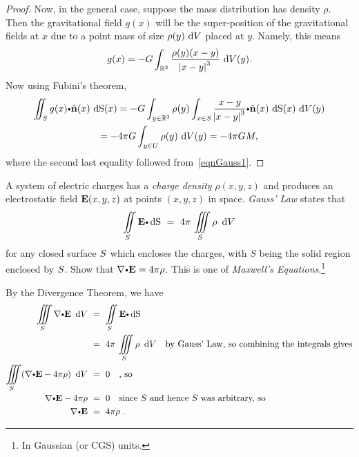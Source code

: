 \begin{proof}
    Now, in the general case, suppose the mass distribution has density $\rho$.
    Then  the gravitational field $g(x)$ will be the super-position of the gravitational fields at $x$ due to a point mass of size $\rho(y) \, \d V$ placed at $y$.
    Namely, this means
    \begin{equation*}
      g(x) = -G \dint_{\bbR^3} \dfrac{\rho(y) (x - y)}{\abs{x - y}^3} \, \d V(y).
    \end{equation*}
    Now using Fubini's theorem,
    \begin{multline*}
      \diint_\superficie g(x) \bp \hat{ \vector{n}}(x) \,  \d \S(x)
	= -G \dint_{y \in \bbR^3} \rho(y) \dint_{x \in \superficie} \dfrac{x -y}{\abs{x - y}^3} \bp \hat{ \vector{n}}(x) \,  \d \S(x) \, \d V(y)
	\\
	= -4 \pi G \dint_{y \in U} \rho(y) \, \d V(y) = -4 \pi GM,
    \end{multline*}
    where the second last equality followed from~\eqref{eqnGauss1}.
  \end{proof}
    
    
    

\begin{exa}
 A system of electric charges has a \emph{charge density} $\rho (x,y,z)$ and produces an electrostatic field
 $\mathbf{ E}(x,y,z)$ at points $(x,y,z)$ in space. \emph{Gauss' Law} states that
 \begin{displaymath}
  \diint\limits_{\superficie} \Dotprod{\vector{E}}{\d \S} ~=~ 4\pi\,\iiint\limits_{S} \rho ~\d V
 \end{displaymath}
 for any closed surface $S$ which encloses the charges, with $S$ being the solid region enclosed by $S$.
 Show that $\Dotprod{\nabla}{\vector{E}} = 4\pi\rho$. This is one of \emph{Maxwell's Equations}.\footnote{In Gaussian
 (or CGS) units.}\vspace{1mm}
\end{exa}
\begin{solu}
 By the Divergence Theorem, we have
 \begin{align*}
  \iiint\limits_{S} \Dotprod{\nabla}{\vector{E}} ~\d V ~&=~ \diint\limits_{\superficie} \Dotprod{\vector{E}}{\d \S}\\
   &=~ 4\pi\,\iiint\limits_{S} \rho ~\d V \quad\text{by Gauss' Law, so combining the integrals gives}\\
   \iiint\limits_{S} ( \Dotprod{\nabla}{\vector{E}} - 4\pi\rho ) ~\d V ~&=~ 0 \quad\text{, so}\\
   \Dotprod{\nabla}{\vector{E}} - 4\pi\rho ~&=~ 0 \quad\text{since $\superficie$ and hence $S$ was arbitrary, so}\\
   \Dotprod{\nabla}{\vector{E}} ~&=~ 4\pi\rho ~.
 \end{align*}
\end{solu}





